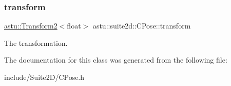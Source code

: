 \subsubsection{\texorpdfstring{transform}{transform}}
{\footnotesize\ttfamily \hyperlink{classastu_1_1Transform2}{astu\+::\+Transform2}$<$float$>$ astu\+::suite2d\+::\+C\+Pose\+::transform}

The transformation. 

The documentation for this class was generated from the following file\+:\begin{DoxyCompactItemize}
\item 
include/\+Suite2\+D/C\+Pose.\+h\end{DoxyCompactItemize}
